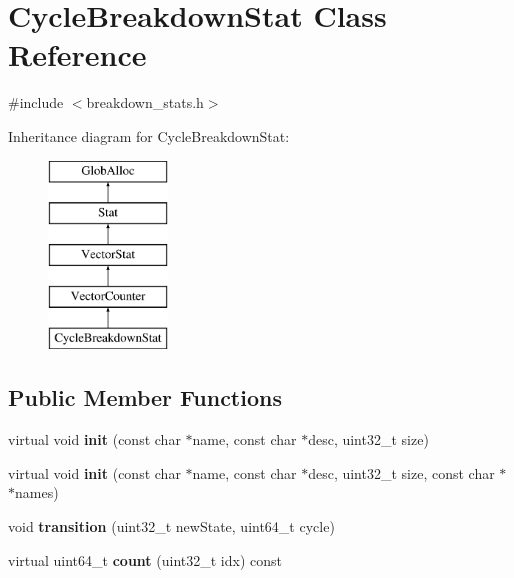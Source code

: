\hypertarget{classCycleBreakdownStat}{\section{Cycle\-Breakdown\-Stat Class Reference}
\label{classCycleBreakdownStat}
}


{\ttfamily \#include $<$breakdown\-\_\-stats.\-h$>$}

Inheritance diagram for Cycle\-Breakdown\-Stat\-:\begin{figure}[H]
\begin{center}
\leavevmode
\includegraphics[height=5.000000cm]{classCycleBreakdownStat}
\end{center}
\end{figure}
\subsection*{Public Member Functions}
\begin{DoxyCompactItemize}
\item 
\hypertarget{classCycleBreakdownStat_ae82676301f6d9fdf98d6f5605fa7f134}{virtual void {\bfseries init} (const char $\ast$name, const char $\ast$desc, uint32\-\_\-t size)}\label{classCycleBreakdownStat_ae82676301f6d9fdf98d6f5605fa7f134}

\item 
\hypertarget{classCycleBreakdownStat_af939f01118305ad8f50359b429fab8a7}{virtual void {\bfseries init} (const char $\ast$name, const char $\ast$desc, uint32\-\_\-t size, const char $\ast$$\ast$names)}\label{classCycleBreakdownStat_af939f01118305ad8f50359b429fab8a7}

\item 
\hypertarget{classCycleBreakdownStat_aec2e256c006156472689efd6e5b98e49}{void {\bfseries transition} (uint32\-\_\-t new\-State, uint64\-\_\-t cycle)}\label{classCycleBreakdownStat_aec2e256c006156472689efd6e5b98e49}

\item 
\hypertarget{classCycleBreakdownStat_a04f433528adb05a600e3a319315f2a9d}{virtual uint64\-\_\-t {\bfseries count} (uint32\-\_\-t idx) const }\label{classCycleBreakdownStat_a04f433528adb05a600e3a319315f2a9d}

\end{DoxyCompactItemize}
